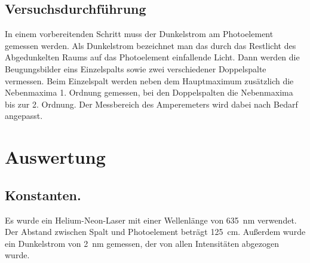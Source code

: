 \subsection{Versuchsdurchführung}
In einem vorbereitenden Schritt muss der Dunkelstrom am Photoelement gemessen werden.
Als Dunkelstrom bezeichnet man das durch das Restlicht des Abgedunkelten Raums auf das
Photoelement einfallende Licht. Dann werden die Beugungsbilder eins Einzelspalts
sowie zwei verschiedener Doppelspalte vermessen. Beim Einzelspalt werden neben dem
Hauptmaximum zusätzlich die Nebenmaxima 1. Ordnung gemessen, bei den Doppelspalten
die Nebenmaxima bis zur 2. Ordnung. Der Messbereich des Amperemeters wird dabei
nach Bedarf angepasst.
\section{Auswertung}
\subsection{Konstanten.}
Es wurde ein Helium-Neon-Laser mit einer Wellenlänge von \SI{635}{\nano\meter} verwendet.
Der Abstand zwischen Spalt und Photoelement beträgt \SI{125}{\centi\meter}. Außerdem wurde
ein Dunkelstrom von \SI{2}{\nano\meter} gemessen, der von allen Intensitäten abgezogen wurde.
